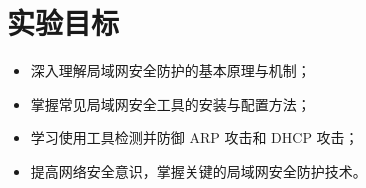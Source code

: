 \section{实验目标}
\begin{itemize}
    \item 深入理解局域网安全防护的基本原理与机制；
    \item 掌握常见局域网安全工具的安装与配置方法；
    \item 学习使用工具检测并防御 ARP 攻击和 DHCP 攻击；
    \item 提高网络安全意识，掌握关键的局域网安全防护技术。
\end{itemize}
